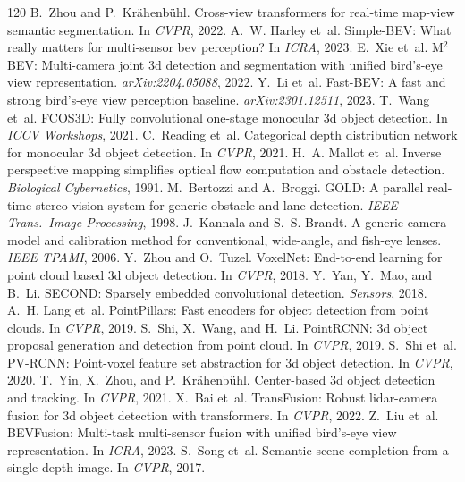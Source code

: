 \documentclass[10pt,twocolumn]{article}
\begin{document}
\begin{thebibliography}{120}
 B.~Zhou and P.~Kr\"ahenb\"uhl. Cross-view transformers for real-time map-view semantic segmentation. In \emph{CVPR}, 2022.
 A.~W. Harley et~al. Simple-BEV: What really matters for multi-sensor bev perception? In \emph{ICRA}, 2023.
 E.~Xie et~al. M$^2$BEV: Multi-camera joint 3d detection and segmentation with unified bird's-eye view representation. \emph{arXiv:2204.05088}, 2022.
 Y.~Li et~al. Fast-BEV: A fast and strong bird's-eye view perception baseline. \emph{arXiv:2301.12511}, 2023.
 T.~Wang et~al. FCOS3D: Fully convolutional one-stage monocular 3d object detection. In \emph{ICCV Workshops}, 2021.
 C.~Reading et~al. Categorical depth distribution network for monocular 3d object detection. In \emph{CVPR}, 2021.
 H.~A. Mallot et~al. Inverse perspective mapping simplifies optical flow computation and obstacle detection. \emph{Biological Cybernetics}, 1991.
 M.~Bertozzi and A.~Broggi. GOLD: A parallel real-time stereo vision system for generic obstacle and lane detection. \emph{IEEE Trans.\ Image Processing}, 1998.
 J.~Kannala and S.~S. Brandt. A generic camera model and calibration method for conventional, wide-angle, and fish-eye lenses. \emph{IEEE TPAMI}, 2006.
 Y.~Zhou and O.~Tuzel. VoxelNet: End-to-end learning for point cloud based 3d object detection. In \emph{CVPR}, 2018.
 Y.~Yan, Y.~Mao, and B.~Li. SECOND: Sparsely embedded convolutional detection. \emph{Sensors}, 2018.
 A.~H. Lang et~al. PointPillars: Fast encoders for object detection from point clouds. In \emph{CVPR}, 2019.
 S.~Shi, X.~Wang, and H.~Li. PointRCNN: 3d object proposal generation and detection from point cloud. In \emph{CVPR}, 2019.
 S.~Shi et~al. PV-RCNN: Point-voxel feature set abstraction for 3d object detection. In \emph{CVPR}, 2020.
 T.~Yin, X.~Zhou, and P.~Kr\"ahenb\"uhl. Center-based 3d object detection and tracking. In \emph{CVPR}, 2021.
 X.~Bai et~al. TransFusion: Robust lidar-camera fusion for 3d object detection with transformers. In \emph{CVPR}, 2022.
 Z.~Liu et~al. BEVFusion: Multi-task multi-sensor fusion with unified bird's-eye view representation. In \emph{ICRA}, 2023.
 S.~Song et~al. Semantic scene completion from a single depth image. In \emph{CVPR}, 2017.

\end{thebibliography}
\end{document}
